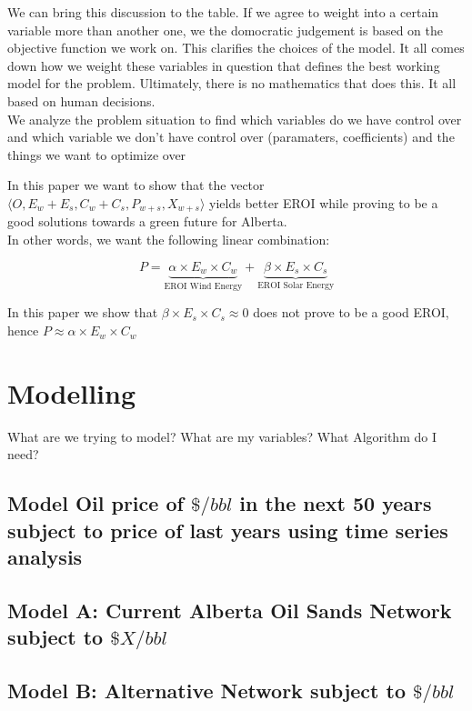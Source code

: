 \documentclass[12pt]{article}
\begin{document}
We can bring this discussion to the table. If we agree to weight into a certain variable more than another one, we the domocratic judgement is based on the objective function we work on. This clarifies the choices of the model. It all comes down how we weight these variables in question that defines the best working model for the problem. Ultimately, there is no mathematics that does this. It all based on human decisions. \\

We analyze the problem situation to find which variables do we have control over and which variable we don't have control over (paramaters, coefficients) and the things we want to optimize over

In this paper we want to show that the vector $\langle O, E_{w} + E_{s}, C_{w} + C_{s}, P_{w+s}, X_{w+s}\rangle$ yields better EROI while proving to be a good solutions towards a green future for Alberta. \\

In other words, we want the following linear combination:

\begin{displaymath}
P = \underbrace{\alpha \times E_w \times C_w}_\text{EROI Wind Energy} + \underbrace{ \beta \times E_s \times C_s}_\text{EROI Solar Energy}
\end{displaymath}

In this paper we show that $\beta \times E_s \times C_s \approx 0$ does not prove to be a good EROI, hence $P \approx \alpha \times E_w \times C_w $\\


\section{Modelling}

What are we trying to model? What are my variables? What Algorithm do I need?
\subsection{Model Oil price of $\$/bbl$ in the next 50 years subject to price of last years using time series analysis}
\subsection{Model A: Current Alberta Oil Sands Network subject to $\$X/bbl$}
\subsection{Model B: Alternative Network subject to $\$/bbl$}
\end{document}
